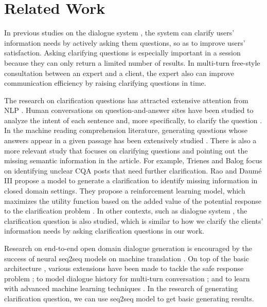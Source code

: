 \section{Related Work}
\label{related}

In previous studies on the dialogue system \cite{DBLP:conf/sigir/AliannejadiZCC19}, the system can clarify users' information needs by actively asking them questions, so as to improve users' satisfaction. Asking clarifying questions is especially important in a session because they can only return a limited number of results. In multi-turn free-style consultation between an expert and a client, the expert also can improve communication efficiency by raising clarifying questions in time.

The research on clarification questions has attracted extensive attention 
from NLP \cite{DBLP:conf/acl/DaumeR18}. Human conversations on question-and-answer 
sites have been studied to analyze the intent of each sentence \cite{DBLP:journals/corr/abs-1804-08759} and, more specifically, to clarify the question \cite{DBLP:conf/chiir/BraslavskiSAD17}. In the machine reading comprehension literature, generating questions whose answers appear in a given passage has been extensively studied \cite{DBLP:conf/emnlp/DuanTCZ17,DBLP:conf/naacl/HeilmanS10,DBLP:conf/nlpcc/ZhouYWTBZ17}. There is also a more relevant study that focuses on clarifying questions and pointing out the missing semantic information in the article. For example, Trienes and Balog \cite{DBLP:conf/ecir/TrienesB19} focus on identifying unclear CQA posts that need further clarification. Rao and Daum{\'{e}} III \cite{DBLP:conf/naacl/RaoD19} propose a model to generate a clarification to identify missing information in closed domain settings. They propose a reinforcement learning model, which maximizes the utility function based on the added value of the potential response to the clarification problem \cite{DBLP:conf/acl/DaumeR18}. In other contexts, such as dialogue system \cite{DBLP:conf/naacl/BoniM03,DBLP:journals/nle/BoniM05}, the clarification question is also studied, which is similar to how we clarify the clients' information needs by asking clarification questions in our work.

Research on end-to-end open domain dialogue generation is encouraged by the success of neural seq2seq models on machine translation \cite{DBLP:conf/nips/SutskeverVL14}. On top of the basic architecture \cite{DBLP:conf/acl/ShangLL15}, various extensions have been made to tackle the safe response problem \cite{DBLP:conf/acl/QiuLBZY19}; to model dialogue history for multi-turn conversation \cite{DBLP:conf/aaai/SerbanSLCPCB17}; and to learn with advanced machine learning techniques \cite{li-etal-2017-adversarial}. In the research of generating clarification question, we can use seq2seq model to get basic generating results.

